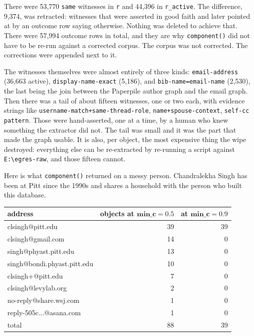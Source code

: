 There were 53{,}770 \texttt{same} witnesses in \texttt{r} and 44{,}396 in \texttt{r\_active}. The difference, 9{,}374, was retracted: witnesses that were asserted in good faith and later pointed at by an outcome row saying otherwise. Nothing was deleted to achieve that. There were 57{,}994 outcome rows in total, and they are why \texttt{component()} did not have to be re-run against a corrected corpus. The corpus was not corrected. The corrections were appended next to it.

The witnesses themselves were almost entirely of three kinds: \texttt{email-address} (36{,}663 active), \texttt{display-name-exact} (5{,}186), and \texttt{bib-name=email-name} (2{,}530), the last being the join between the Paperpile author graph and the email graph. Then there was a tail of about fifteen witnesses, one or two each, with evidence strings like \texttt{username-match+same-thread-role}, \texttt{name+spouse-context}, \texttt{self-cc pattern}. Those were hand-asserted, one at a time, by a human who knew something the extractor did not. The tail was small and it was the part that made the graph usable. It is also, per object, the most expensive thing the wipe destroyed: everything else can be re-extracted by re-running a script against \texttt{E:\textbackslash egres-raw}, and those fifteen cannot.

Here is what \texttt{component()} returned on a messy person. Chandralekha Singh has been at Pitt since the 1990s and shares a household with the person who built this database.

\begin{center}
\begin{tabular}{lrr}
\toprule
\textbf{address} & \textbf{objects at $\mathbf{min\_c=0.5}$} & \textbf{at $\mathbf{min\_c=0.9}$} \\
\midrule
clsingh@pitt.edu & 39 & 39 \\
clsingh@gmail.com & 14 & 0 \\
singh@phyast.pitt.edu & 13 & 0 \\
singh@bondi.phyast.pitt.edu & 10 & 0 \\
clsingh+@pitt.edu & 7 & 0 \\
clsingh@levylab.org & 2 & 0 \\
no-reply@share.wsj.com & 1 & 0 \\
reply-505c...@asana.com & 1 & 0 \\
\midrule
total & 88 & 39 \\
\bottomrule
\end{tabular}
\end{center}

